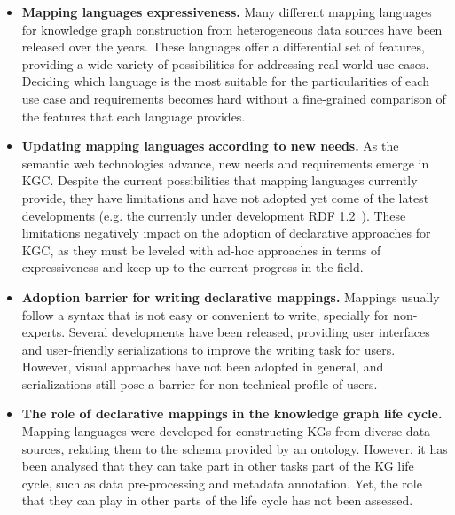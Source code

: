 \begin{itemize}
    \item \textbf{Mapping languages expressiveness.} Many different mapping languages for knowledge graph construction from heterogeneous data sources have been released over the years. These languages offer a differential set of features, providing a wide variety of possibilities for addressing real-world use cases. Deciding which language is the most suitable for the particularities of each use case and requirements becomes hard without a fine-grained comparison of the features that each language provides. 
    
    \item \textbf{Updating mapping languages according to new needs.} As the semantic web technologies advance, new needs and requirements emerge in KGC. Despite the current possibilities that mapping languages currently provide, they have limitations and have not adopted yet come of the latest developments (e.g. the currently under development RDF 1.2~\parencite{hartig2023rdf}). These limitations negatively impact on the adoption of declarative approaches for KGC, as they must be leveled with ad-hoc approaches in terms of expressiveness and keep up to the current progress in the field.
    
    \item \textbf{Adoption barrier for writing declarative mappings.} Mappings usually follow a syntax that is not easy or convenient to write, specially for non-experts. Several developments have been released, providing user interfaces and user-friendly serializations to improve the writing task for users. However, visual approaches have not been adopted in general, and serializations still pose a barrier for non-technical profile of users. 

    
    \item \textbf{The role of declarative mappings in the knowledge graph life cycle.} Mapping languages were developed for constructing KGs from diverse data sources, relating them to the schema provided by an ontology. However, it has been analysed that they can take part in other tasks part of the KG life cycle, such as data pre-processing and metadata annotation. Yet, the role that they can play in other parts of the life cycle has not been assessed. 
\end{itemize}
